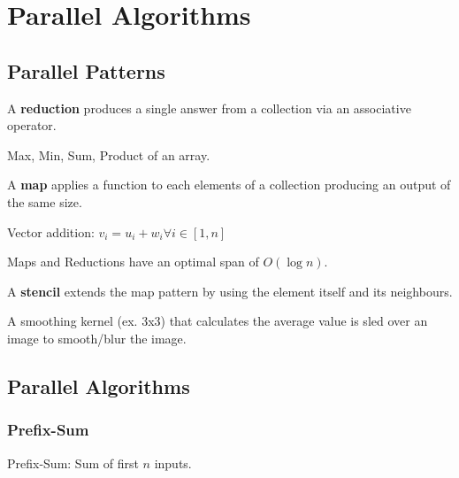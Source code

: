 \section{Parallel Algorithms}

\subsection{Parallel Patterns}

\begin{definition}
A \textbf{reduction} produces a single answer from a collection via an associative operator.
\end{definition}

\begin{example}
Max, Min, Sum, Product of an array.
\end{example}

\begin{definition}
A \textbf{map} applies a function to each elements of a collection producing an output of the same size.
\end{definition}

\begin{example}
Vector addition: $v_i = u_i + w_i \forall i \in [1, n]$
\end{example}

\begin{remark}
Maps and Reductions have an optimal span of $O(\log n)$.
\end{remark}

\begin{definition}
A \textbf{stencil} extends the map pattern by using the element itself and its neighbours.  
\end{definition}

\begin{example}
A smoothing kernel (ex. 3x3) that calculates the average value is sled over an image to smooth/blur the image.
\end{example}

\subsection{Parallel Algorithms}

\subsubsection{Prefix-Sum}

Prefix-Sum: Sum of first $n$ inputs.

